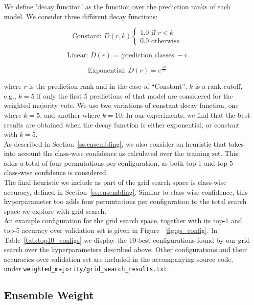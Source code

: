  We define 'decay function' as the function over the prediction ranks of each model. We consider three different decay functions:

$$\text{Constant: } D(r,k) \begin{cases}
               1.0 \text{ if } r < k\\
               0.0 \text{ otherwise}
            \end{cases}$$

$$\text{Linear: } D(r) = |\text{prediction\_classes}| - r$$

$$\text{Exponential: } D(r) = e^{\frac{-r}{5}}$$
 
where $r$ is the prediction rank and in the case of ``Constant'', $k$ is a rank cutoff, e.g., $k = 5$ if only the first 5 predictions of that model are considered for the weighted majority vote.  We use two variations of constant decay function, one where $k = 5$, and another where $k = 10$. In our experiments, we find that the best results are obtained when the decay function is either exponential, or constant with $k = 5$.\\

 As described in Section~\ref{ss:ensembling}, we also consider an heuristic that takes into account the class-wise confidence as calculated over the training set.  This adds a total of four permutations per configuration, as both top-1 and top-5 class-wise confidence is considered.\\

 The final heuristic we include as part of the grid search space is class-wise accuracy, defined in Section~\ref{ss:ensembling}.  Similar to class-wise confidence, this hyperparameter too adds four permutations per configuration to the total search space we explore with grid search.\\

An example configuration for the grid search space, together with its top-1 and top-5 accuracy over validation set is given in Figure ~\ref{fig:gs_config}.  In Table~\ref{tab:top10_configs} we display the 10 best configurations found by our grid search over the hyperparameters described above. Other configurations and their accuracies over validation set are included in the accompanying source code, under \texttt{weighted\_majority/grid\_search\_results.txt}.

\subsection{Ensemble Weight}

